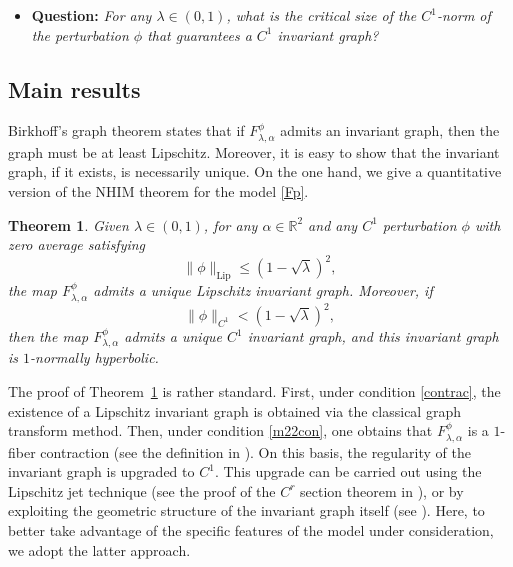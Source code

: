 \documentclass{amsart}
\newtheorem{Theorem}{Theorem}
\begin{document}
	\vspace{1ex}
	
	\begin{itemize}
		\item \textbf{Question:} {\it For any \(\lambda\in(0,1)\), what is  the critical size of the \(C^1\)-norm of the perturbation \(\phi\) that guarantees a \(C^1\) invariant graph?}
	\end{itemize}
	
	\vspace{1ex}
	\subsection{Main results}
	Birkhoff's graph theorem \cite{Bir20} states that if \(F_{\lambda,\alpha}^\phi\) admits an invariant graph, then the graph must be at least Lipschitz. Moreover, it is easy to show that the invariant graph, if it exists, is necessarily unique. On the one hand, we give a quantitative version of the NHIM theorem for the model \eqref{Fp}.
	
	\begin{Theorem}\label{M2}
		Given \(\lambda \in (0,1)\), for any \(\alpha \in \mathbb{R}^2\) and any \(C^1\) perturbation \(\phi\) with zero average satisfying
		\begin{equation}\label{contrac}
			\|\phi\|_{\mathrm{Lip}} \leq (1-\sqrt{\lambda})^2,
		\end{equation}
		the map \(F_{\lambda,\alpha}^\phi\) admits a unique Lipschitz invariant graph. Moreover, if
		\begin{equation}\label{m22con}
			\|\phi\|_{C^1} < (1-\sqrt{\lambda})^2,
		\end{equation}
		then the map \(F_{\lambda,\alpha}^\phi\) admits a unique \(C^1\) invariant graph, and this invariant graph is $1$-normally hyperbolic.
	\end{Theorem}
	
	The proof of Theorem~\ref{M2} is rather standard. First, under condition \eqref{contrac}, the existence of a Lipschitz invariant graph is obtained via the classical graph transform method. Then, under condition \eqref{m22con}, one obtains that \(F_{\lambda,\alpha}^\phi\) is a \(1\)-fiber contraction (see the definition in \cite[Page 31]{HPS}). On this basis, the regularity of the invariant graph is upgraded to \(C^1\). This upgrade can be carried out using the Lipschitz jet technique (see the proof of the \(C^r\) section theorem in \cite[Pages 33--35]{HPS}), or by exploiting the geometric structure of the invariant graph itself (see \cite{BB}). Here, to better take advantage of the specific features of the model under consideration, we adopt the latter approach.
	
\end{document}
